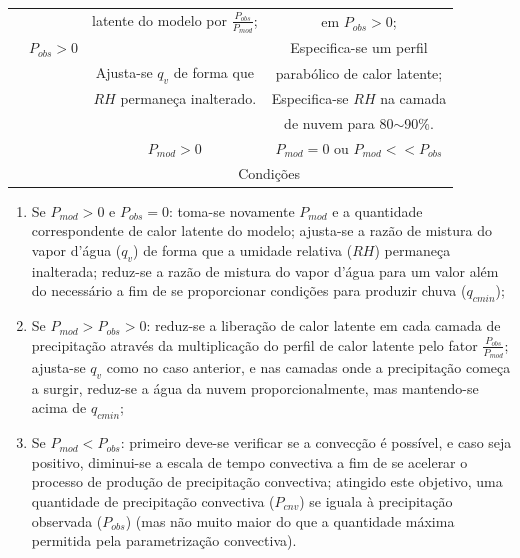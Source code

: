 \begin{table}[!h]
\begin{tabular}{|c|c|c|c|}
\begin{sideways}
\end{sideways} &  & latente do modelo por $\frac{P_{obs}}{P_{mod}}$; & em $P_{obs}>0$;\tabularnewline
\begin{sideways}

\end{sideways} & $P_{obs}>0$&  & Especifica-se um perfil\tabularnewline
\begin{sideways}

\end{sideways} &  & Ajusta-se $q_{v}$ de forma que & parabólico de calor latente;\tabularnewline
\begin{sideways}

\end{sideways} &  & $RH$ permaneça inalterado. & Especifica-se $RH$ na camada\tabularnewline
\begin{sideways}

\end{sideways} &  &  & de nuvem para 80$\sim$90\%.\tabularnewline
\hline
\multicolumn{1}{c}{} &  & $P_{mod}>0$ & $P_{mod}=0$ ou $P_{mod}<<P_{obs}$\tabularnewline
\cline{3-4} 
\multicolumn{1}{c}{} &  & \multicolumn{2}{c|}{Condições}\tabularnewline
\cline{3-4} 
\end{tabular}
\end{table}

\break

\begin{enumerate}
\item Se $P_{mod}>0$ e $P_{obs}=0$: toma-se novamente $P_{mod}$ e a quantidade correspondente de calor latente do modelo; ajusta-se a razão de mistura do vapor d'água ($q_{v}$) de forma que a umidade relativa ($RH$) permaneça inalterada; reduz-se a razão de mistura do vapor d'água para um valor além do necessário a fim de se proporcionar condições para produzir chuva ($q_{cmin}$);
\item Se $P_{mod}>P_{obs}>0$: reduz-se a liberação de calor latente em cada camada de precipitação através da multiplicação do perfil de calor latente pelo fator $\frac{P_{obs}}{P_{mod}}$; ajusta-se $q_{v}$ como no caso anterior, e nas camadas onde a precipitação começa a surgir, reduz-se a água da nuvem proporcionalmente, mas mantendo-se acima de $q_{cmin}$;
\item Se $P_{mod}<P_{obs}$: primeiro deve-se verificar se a convecção é possível, e caso seja positivo, diminui-se a escala de tempo convectiva a fim de se acelerar o processo de produção de precipitação convectiva; atingido este objetivo, uma quantidade de precipitação convectiva ($P_{cnv}$) se iguala à precipitação observada ($P_{obs}$) (mas não muito maior do que a quantidade máxima permitida pela parametrização convectiva).
\end{enumerate}

